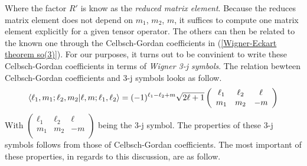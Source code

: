 %
%
Where the factor $R'$ is know as the \textit{reduced matrix element}. Because the reduces matrix element does not depend on $m_1$, $m_2$, $m$, it suffices to compute one matrix element explicitly for a given tensor operator. The others can then be related to the known one through the Celbsch-Gordan coefficients in (\ref{Wigner-Eckart theorem so(3)}). For our purposes, it turns out to be convinient to write these Celbsch-Gordan coefficients in terms of \textit{Wigner 3-j symbols}. The relation bewteen Celbsch-Gordan coefficients and 3-j symbols looks as follow.
%
%
\begin{equation}\label{coupling-coefficients 3j relation}
\braket{\ell_1, m_1; \ell_2, m_2}{\ell, m; \ell_1, \ell_2}
=
(-1)^{\ell_1 - \ell_2 + m} \sqrt{2 \ell + 1}
\left( \begin{array}{ccc}
\ell_1 & \ell_2 & \ell \\
m_1 & m_2 & -m \\
\end{array} \right)
\end{equation}
%
%
With $\left( \begin{array}{ccc} \ell_1 & \ell_2 & \ell \\ m_1 & m_2 & -m \\ \end{array} \right)$ being the 3-j symbol. The properties of these 3-j symbols follows from those of Celbsch-Gordan coefficients. The most important of these properties, in regards to this discussion, are as follow.
%
%
